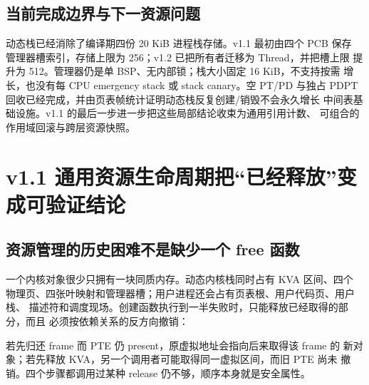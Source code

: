 \subsection{当前完成边界与下一资源问题}

动态栈已经消除了编译期四份 20 KiB 进程栈存储。v1.1 最初由四个 PCB 保存
管理器槽索引，存储上限为 256；v1.2 已把所有者迁移为 Thread，并把槽上限
提升为 512。管理器仍是单 BSP、无内部锁；栈大小固定 16 KiB，不支持按需
增长，也没有每 CPU emergency stack 或 stack canary。空 PT/PD 与独占
PDPT 回收已经完成，并由页表帧统计证明动态栈反复创建/销毁不会永久增长
中间表基础设施。v1.1 的最后一步进一步把这些局部结论收束为通用引用计数、
可组合的作用域回滚与跨层资源快照。

\section{v1.1 通用资源生命周期把“已经释放”变成可验证结论}

\subsection{资源管理的历史困难不是缺少一个 free 函数}

一个内核对象很少只拥有一块同质内存。动态内核栈同时占有 KVA 区间、四个
物理页、四张叶映射和管理器槽；用户进程还会占有页表根、用户代码页、用户栈、
描述符和调度现场。创建函数执行到一半失败时，只能释放已经取得的部分，而且
必须按依赖关系的反方向撤销：

\begin{center}
\end{center}

若先归还 frame 而 PTE 仍 present，原虚拟地址会指向后来取得该 frame 的
新对象；若先释放 KVA，另一个调用者可能取得同一虚拟区间，而旧 PTE 尚未
撤销。四个步骤都调用过某种 release 仍不够，顺序本身就是安全属性。

